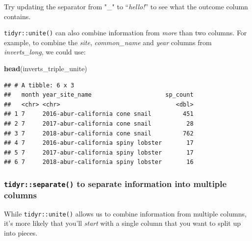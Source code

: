 \documentclass[]{book}
\newenvironment{Shaded}{\begin{snugshade}}{\end{snugshade}}
\newcommand{\CommentTok}[1]{\textcolor[rgb]{0.56,0.35,0.01}{\textit{#1}}}
\newcommand{\DataTypeTok}[1]{\textcolor[rgb]{0.13,0.29,0.53}{#1}}
\newcommand{\KeywordTok}[1]{\textcolor[rgb]{0.13,0.29,0.53}{\textbf{#1}}}
\newcommand{\NormalTok}[1]{#1}
\newcommand{\OperatorTok}[1]{\textcolor[rgb]{0.81,0.36,0.00}{\textbf{#1}}}
\newcommand{\StringTok}[1]{\textcolor[rgb]{0.31,0.60,0.02}{#1}}
\begin{document}
Try updating the separator from "\_" to ``\emph{hello!}'' to see what the outcome column contains.

\texttt{tidyr::unite()} can also combine information from \emph{more} than two columns. For example, to combine the \emph{site}, \emph{common\_name} and \emph{year} columns from \emph{inverts\_long}, we could use:

\begin{Shaded}
\end{Shaded}

\begin{Shaded}
\begin{Highlighting}[]
\KeywordTok{head}\NormalTok{(inverts_triple_unite)}
\end{Highlighting}
\end{Shaded}

\begin{verbatim}
## # A tibble: 6 x 3
##   month year_site_name                     sp_count
##   <chr> <chr>                                 <dbl>
## 1 7     2016-abur-california cone snail         451
## 2 7     2017-abur-california cone snail          28
## 3 7     2018-abur-california cone snail         762
## 4 7     2016-abur-california spiny lobster       17
## 5 7     2017-abur-california spiny lobster       17
## 6 7     2018-abur-california spiny lobster       16
\end{verbatim}

\hypertarget{tidyrseparate-to-separate-information-into-multiple-columns}{%
\subsubsection{\texorpdfstring{\texttt{tidyr::separate()} to separate information into multiple columns}{tidyr::separate() to separate information into multiple columns}}\label{tidyrseparate-to-separate-information-into-multiple-columns}}

While \texttt{tidyr::unite()} allows us to combine information from multiple columns, it's more likely that you'll \emph{start} with a single column that you want to split up into pieces.
\end{document}
